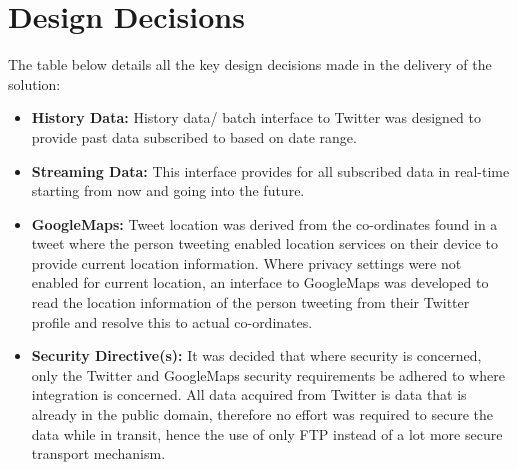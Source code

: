 \documentclass[12pt]{article} %
\begin{document}
	
	\section {Design Decisions}
	
	The table below details all the key design decisions made in the delivery of the solution:
	
\begin{itemize} 
	\item \textbf{History Data:} History data/ batch interface to Twitter was designed to provide past data subscribed to based on date range.
	
	\item \textbf{Streaming Data:} 
	This interface provides for all subscribed data in real-time starting from now and going into the future.
	
	\item \textbf{GoogleMaps:} 
	Tweet location was derived from the co-ordinates found in a tweet where the person tweeting enabled location services on their device to provide current location information. Where privacy settings were not enabled for current location, an interface to GoogleMaps was developed to read the location information of the person tweeting from their Twitter profile and resolve this to actual co-ordinates.
	
	\item \textbf{Security Directive(s):} 
	It was decided that where security is concerned, only the Twitter and GoogleMaps security requirements be adhered to where integration is concerned. All data acquired from Twitter is data that is already in the public domain, therefore no effort was required to secure the data while in transit, hence the use of only FTP instead of a lot more secure transport mechanism.
\end{itemize}
	
	
	

	
	
	

	
	
	
\end{document}
